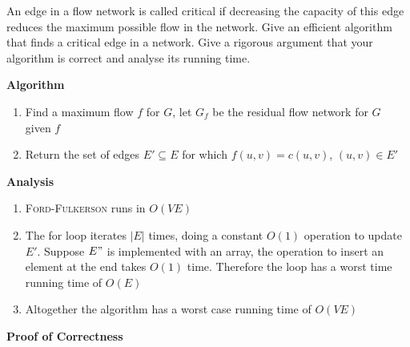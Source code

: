\documentclass[11pt]{article}
\begin{document}
An edge in a flow network is called critical if decreasing the capacity of this edge reduces the maximum possible flow in the network. Give an efficient algorithm that finds a critical edge in a network. Give a rigorous argument that your algorithm is correct and analyse its running time.

\begin{solution}

    \textbf{Algorithm}
    \begin{enumerate}
        \item Find a maximum flow $f$ for $G$, let $G_f$ be the residual flow network for $G$ given $f$
        \item Return the set of edges $E' \subseteq E$ for which $f(u,v) = c(u,v)$, $(u,v) \in E'$
    \end{enumerate}
    \textbf{Analysis}
    \begin{enumerate}
        \item \textsc{Ford-Fulkerson} runs in $O(VE)$
        \item The for loop iterates $|E|$ times, doing a constant $O(1)$ operation to update $E'$. Suppose $E"$ is implemented with an array, the operation to insert an element at the end takes $O(1)$ time. Therefore the loop has a worst time running time of $O(E)$
        \item Altogether the algorithm has a worst case running time of $O(VE)$ 
    \end{enumerate}

    \begin{algorithm}[H]
        
    \end{algorithm}


    \textbf{Proof of Correctness}


\end{solution}
\end{document}
